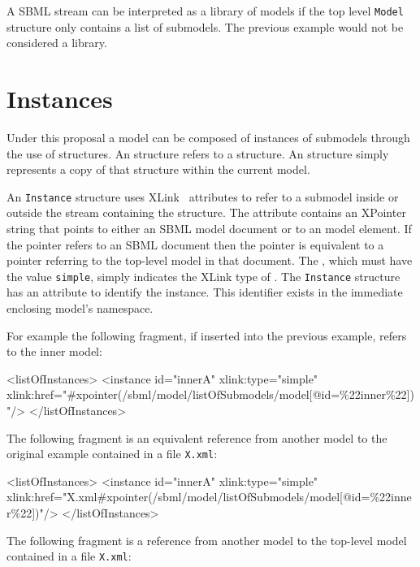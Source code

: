 \documentclass{cekarticle}
\begin{document}
A SBML stream can be interpreted as a library of models if the top level \texttt{Model} structure only contains a list of submodels.  The previous
example would not be considered a library.

\section{Instances}
\label{sec:instances}

Under this proposal a model can be composed of instances of submodels through the use
of  structures.  An  structure refers to a
 structure.  An  structure simply represents a copy of
that  structure within the current model.

An \texttt{Instance} structure uses XLink~\citep{derose:2001} attributes to refer to
a submodel inside or outside the stream containing the  structure.
The  attribute contains an XPointer~\citep{derose:2002} string that
points to either an SBML model document or to an model element.  If the pointer
refers to an SBML document then the pointer is equivalent to a pointer referring to
the top-level model in that document. The , which must have the value
\texttt{simple}, simply indicates the XLink type of . The
\texttt{Instance} structure has an  attribute to identify the instance.
This identifier exists in the immediate enclosing model's namespace. 

For example the following fragment, if inserted into the previous example, refers to the inner model:
\begin{example}
<listOfInstances>
    <instance
        id="innerA"
        xlink:type="simple"
        xlink:href="#xpointer(/sbml/model/listOfSubmodels/model[@id=\%22inner\%22])"/>
</listOfInstances>
\end{example}

The following fragment is an equivalent reference from another model to the original example contained in a file \texttt{X.xml}:

\begin{example}
<listOfInstances>
    <instance
        id="innerA" 
        xlink:type="simple"
        xlink:href="X.xml#xpointer(/sbml/model/listOfSubmodels/model[@id=\%22inner\%22])"/>
</listOfInstances>
\end{example}

The following fragment is a reference from another model to the top-level model contained in a file \texttt{X.xml}:
\end{document}
